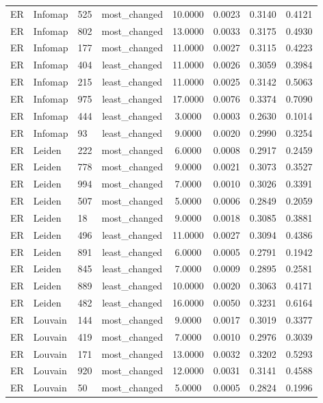 \begin{longtable}{lllccccc}
ER & Infomap & 525 & most\_changed & 10.0000 & 0.0023 & 0.3140 & 0.4121 \\
ER & Infomap & 802 & most\_changed & 13.0000 & 0.0033 & 0.3175 & 0.4930 \\
ER & Infomap & 177 & most\_changed & 11.0000 & 0.0027 & 0.3115 & 0.4223 \\
ER & Infomap & 404 & least\_changed & 11.0000 & 0.0026 & 0.3059 & 0.3984 \\
ER & Infomap & 215 & least\_changed & 11.0000 & 0.0025 & 0.3142 & 0.5063 \\
ER & Infomap & 975 & least\_changed & 17.0000 & 0.0076 & 0.3374 & 0.7090 \\
ER & Infomap & 444 & least\_changed & 3.0000 & 0.0003 & 0.2630 & 0.1014 \\
ER & Infomap & 93 & least\_changed & 9.0000 & 0.0020 & 0.2990 & 0.3254 \\
ER & Leiden & 222 & most\_changed & 6.0000 & 0.0008 & 0.2917 & 0.2459 \\
ER & Leiden & 778 & most\_changed & 9.0000 & 0.0021 & 0.3073 & 0.3527 \\
ER & Leiden & 994 & most\_changed & 7.0000 & 0.0010 & 0.3026 & 0.3391 \\
ER & Leiden & 507 & most\_changed & 5.0000 & 0.0006 & 0.2849 & 0.2059 \\
ER & Leiden & 18 & most\_changed & 9.0000 & 0.0018 & 0.3085 & 0.3881 \\
ER & Leiden & 496 & least\_changed & 11.0000 & 0.0027 & 0.3094 & 0.4386 \\
ER & Leiden & 891 & least\_changed & 6.0000 & 0.0005 & 0.2791 & 0.1942 \\
ER & Leiden & 845 & least\_changed & 7.0000 & 0.0009 & 0.2895 & 0.2581 \\
ER & Leiden & 889 & least\_changed & 10.0000 & 0.0020 & 0.3063 & 0.4171 \\
ER & Leiden & 482 & least\_changed & 16.0000 & 0.0050 & 0.3231 & 0.6164 \\
ER & Louvain & 144 & most\_changed & 9.0000 & 0.0017 & 0.3019 & 0.3377 \\
ER & Louvain & 419 & most\_changed & 7.0000 & 0.0010 & 0.2976 & 0.3039 \\
ER & Louvain & 171 & most\_changed & 13.0000 & 0.0032 & 0.3202 & 0.5293 \\
ER & Louvain & 920 & most\_changed & 12.0000 & 0.0031 & 0.3141 & 0.4588 \\
ER & Louvain & 50 & most\_changed & 5.0000 & 0.0005 & 0.2824 & 0.1996 \\

\end{longtable}
